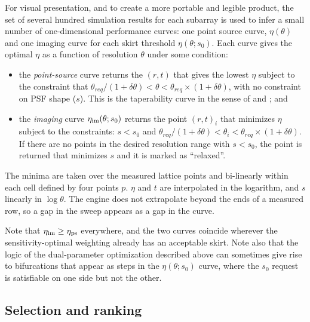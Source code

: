 \documentclass[11pt]{article}
\begin{document}
For visual presentation, and to create a more portable and legible
product, the set of several hundred simulation results for each
subarray is used to infer a small number of one-dimensional
performance curves: one point source curve, $\eta(\theta)$ and one imaging curve for
each skirt threshold $\eta(\theta;s_0)$.  Each curve gives the optimal $\eta$ as a
function of resolution $\theta$ under some condition:
\begin{itemize}
\item the {\it point-source} curve returns the $(r,t)$
  that gives the lowest $\eta$ subject to the constraint
  that $\theta_{req}/(1+\delta \theta) < \theta < \theta_{req} \times (1+\delta \theta)$, with
  no constraint on PSF shape ($s$).
  This is  the taperability curve
  in the sense of \citep{memo55} and \citep{memo72}; and
\item the {\it imaging} curve 
  $\eta_{\rm im}(\theta; s_0)$ returns the point $(r,t)_i$ that
  minimizes $\eta$ subject to the constraints: $s < s_0$ and 
$ \theta_{req}/(1+\delta \theta) < \theta_i <  \theta_{req} \times (1+\delta \theta)$.
  If there are no points in the desired resolution range with $s < s_0$,  
  the point is returned that minimizes $s$ and
  it is marked as ``relaxed''.  
\end{itemize}
The minima are taken over the measured lattice points and bi-linearly
within each cell defined by four points $p$. $\eta$ and $t$ are
interpolated in the logarithm, and $s$ linearly in $\log\theta$.  The
engine does not extrapolate beyond the ends of a measured row, so a
gap in the sweep appears as a gap in the curve.

Note that $\eta_{\rm im} \ge \eta_{\rm ps}$ everywhere, and the two
curves coincide wherever the sensitivity-optimal weighting already has
an acceptable skirt. Note also that the logic of the dual-parameter
optimization described above can sometimes give rise to bifurcations
that appear as steps in the  $\eta(\theta;s_0)$ curve, where the $s_0$
request is satisfiable on one side but not the other.

\subsection{Selection and ranking}
\label{sec:selection}
\end{document}
